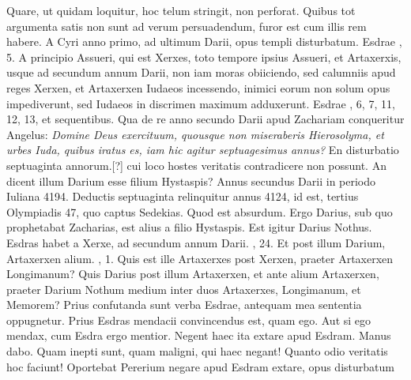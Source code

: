 Quare, ut quidam loquitur, hoc telum stringit, non perforat.
Quibus tot argumenta satis non sunt ad verum persuadendum, furor est
cum illis rem habere.
%
A Cyri anno primo, ad ultimum Darii, opus
templi disturbatum.
Es\-drae , 5.
A principio Assueri, qui est
Xerxes, toto tempore ipsius Assueri, et Artaxerxis, usque ad secundum
annum Darii, non iam moras obiiciendo, sed calumniis apud
reges Xerxen, et Artaxerxen Iudaeos incessendo, inimici eorum
non solum opus impediverunt, sed Iudaeos in discrimen maximum
adduxerunt.
Esdrae , 6, 7, 11, 12, 13, et sequentibus.
Qua de re
anno secundo Darii apud Zachariam conqueritur Angelus: \textit{Domine
Deus exercituum, quousque non miseraberis Hierosolyma, et
urbes Iuda, quibus iratus es, iam hic agitur septuagesimus annus?}
En disturbatio septuaginta annorum.[?] cui loco hostes
 veritatis contradicere
non possunt.
An dicent illum Darium esse filium Hystaspis?
Annus secundus Darii in periodo Iuliana 4194. Deductis septuaginta
relinquitur annus 4124, id est, tertius Olympiadis 47,
quo captus Sedekias.
Quod est absurdum.
Ergo Darius, sub quo
prophetabat Zacharias, est alius a filio Hystaspis.
Est igitur Darius
Nothus.
Esdras habet a Xerxe, ad secundum annum Darii.
, 24.
Et post illum Darium, Artaxerxen alium.
, 1.
Quis
est ille Artaxerxes post Xerxen, praeter Artaxerxen Longimanum?
Quis Darius post illum Artaxerxen, et ante alium Artaxerxen, praeter
Darium Nothum medium inter duos Artaxerxes, Longimanum,
et Memorem?
Prius confutanda sunt verba Esdrae, antequam
mea sententia oppugnetur.
Prius Esdras mendacii convincendus
est, quam ego.
Aut si ego mendax, cum Esdra ergo mentior.
Negent haec ita extare apud Esdram.
Manus dabo.
Quam inepti
sunt, quam maligni, qui haec negant!
Quanto odio veritatis hoc faciunt!
Oportebat Pererium negare apud Esdram extare, opus disturbatum
